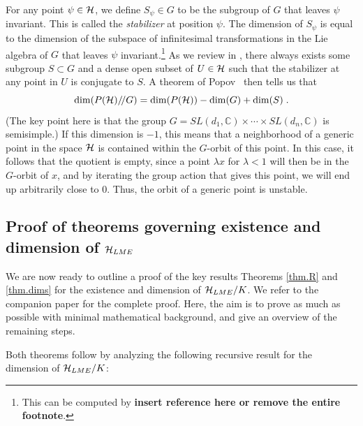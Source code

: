 \documentclass[12pt]{article}
\theoremstyle{definition}
\newcommand{\be}{\begin{equation}}
\newcommand{\ee}{\end{equation}}
\newcommand{\GITquot}{/\!/}
\begin{document}
For any point $\psi \in {\cal H}$, we define $S_\psi \in G$ to be the subgroup of $G$ that leaves $\psi$ invariant. This is called the {\it stabilizer} at position $\psi$. The dimension of $S_\psi$ is equal to the dimension of the subspace of infinitesimal transformations in the Lie algebra of $G$ that leaves $\psi$ invariant.\footnote{This can be computed by {\bf insert reference here or remove the entire footnote}.} As we review in \cite{mathpaper}, there always exists some subgroup $S \subset G$ and a dense open subset of $U \in {\cal H}$ such that the stabilizer at any point in $U$ is conjugate to $S$. A theorem of Popov~\cite{popov} then tells us that 
\be
\label{realdim}
{\rm dim}(P({\cal H})\GITquot G) = {\rm dim}(P({\cal H})) - {\rm dim}(G) + {\rm dim}(S)    \; .
\ee
(The key point here is that the group $G = SL(d_1, \mathbb{C}) \times \cdots \times SL(d_n, \mathbb{C})$ is semisimple.)
If this dimension is $-1$, this means that a neighborhood of a generic point in the space ${\cal H}$ is contained within the $G$-orbit of this point. In this case, it follows that the quotient is empty, since a point $\lambda x$ for $\lambda < 1$ will then be in the $G$-orbit of $x$, and by iterating the group action that gives this point, we will end up arbitrarily close to 0. Thus, the orbit of a generic point is unstable.

\subsection{Proof of theorems governing existence and dimension of ${\cal H}_{LME}$}

We are now ready to outline a proof of the key results Theorems \ref{thm.R} and \ref{thm.dims} for the existence and dimension of ${\cal H}_{LME}/K$. We refer to the companion paper \cite{mathpaper} for the complete proof. Here, the aim is to prove as much as possible with minimal mathematical background, and give an overview of the remaining steps.

Both theorems follow by analyzing the following recursive result for the dimension of ${\cal H}_{LME}/K$:
\end{document}
